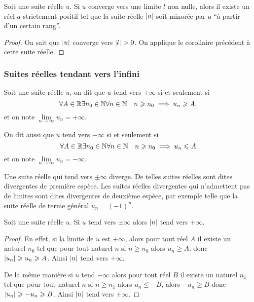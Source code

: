 \begin{cor}
  Soit une suite réelle $u$. Si $u$ converge vers une limite $l$ non nulle, alors il existe un réel $a$ strictement positif tel que la suite réelle $\left\lvert u\right\rvert$ soit minorée par $a$ ``à partir d'un certain rang''.
\end{cor}
\begin{proof}
  On sait que $\left\lvert u\right\rvert$  converge vers $\left\lvert l\right\rvert>0$. On applique le corollaire précédent à cette suite réelle.
\end{proof}

\subsubsection{Suites réelles tendant vers l'infini}

\begin{defdef}
  Soit une suite réelle $u$, on dit que $u$ tend vers $+\infty$ si et seulement si
  \begin{equation}
    \forall A \in \mathbb{R} \exists n_0 \in \mathbb{N} \forall n \in \mathbb{N} \quad n \geqslant n_0 \implies u_n \geqslant A,
  \end{equation}
  et on note $\lim\limits_{n\to\infty}u_n=+\infty$. 

  On dit aussi que $u$ tend vers $-\infty$ si et seulement si
  \begin{equation}
    \forall A \in \mathbb{R} \exists n_0 \in \mathbb{N} \forall n \in \mathbb{N} \quad n \geqslant n_0 \implies u_n \leqslant A
  \end{equation}
  et on note $\lim\limits_{n\to\infty}u_n=-\infty$.
\end{defdef}
Une suite réelle qui tend vers $\pm\infty$ diverge. De telles suites réelles sont dites divergentes de première espèce. Les suites réelles divergentes qui n'admettent pas de limites sont dites divergentes de deuxième espèce, par exemple telle que la suite réelle de terme général $u_n=(-1)^n$.
\begin{prop}
  Soit une suite réelle $u$. Si $u$ tend vers $\pm\infty$ alors $\left\lvert u\right\rvert$ tend vers $+\infty$.
\end{prop}
\begin{proof}
  En effet, si la limite de $u$ est $+\infty$, alors pour tout réel $A$ il existe un naturel $n_0$  tel que pour tout naturel $n$ si $n \geqslant n_0$ alors $u_n \geqslant A$, donc $\left\lvert u_n\right\rvert \geqslant u_n \geqslant A$. Ainsi $\left\lvert u\right\rvert$ tend vers $+\infty$. 

  De la même manière si $u$ tend $-\infty$ alors  pour tout réel $B$ il existe un naturel $n_1$  tel que pour tout naturel $n$ si $n \geqslant n_1$ alors $u_n \leqslant -B$, alors $-u_n \geqslant B$ donc $\left\lvert u_n\right\rvert \geqslant -u_n \geqslant B$. Ainsi $\left\lvert u\right\rvert$ tend vers $+\infty$. 
\end{proof}
